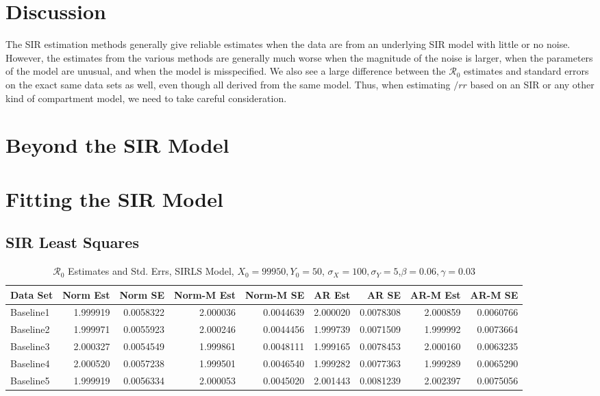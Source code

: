 \documentclass[12pt]{article}
\newcommand{\rr}{\ensuremath{\mathcal{R}_0}}
\begin{document}
\section{Discussion}\label{sec:discussion}

The SIR estimation methods generally give reliable estimates when the data are from an underlying SIR model with little or no noise. However, the estimates from the various methods are generally much worse when the magnitude of the noise is larger, when the parameters of the model are unusual, and when the model is misspecified. We also see a large difference between the $\rr$ estimates and standard errors on the exact same data sets as well, even though all derived from the same model. Thus, when estimating $/rr$ based on an SIR or any other kind of compartment model, we need to take careful consideration.





\appendix

\section{Beyond the SIR Model}

\section{Fitting the SIR Model}

\subsection{SIR Least Squares}

\begin{table}[H]
	
	\caption{\label{tab:}$\rr$ Estimates and Std. Errs, SIRLS Model,
		$X_0 = 99950, Y_0 = 50$, $\sigma_X = 100, \sigma_Y = 5$,$\beta = 0.06, \gamma = 0.03$}
	\centering
	\begin{footnotesize}
		\begin{tabular}[t]{l|r|r|r|r|r|r|r|r}
			\hline
			Data Set & Norm Est & Norm SE & Norm-M Est & Norm-M SE & AR Est & AR SE & AR-M Est & AR-M SE\\
			\hline
			Baseline1 & 1.999919 & 0.0058322 & 2.000036 & 0.0044639 & 2.000020 & 0.0078308 & 2.000859 & 0.0060766\\
			\hline
			Baseline2 & 1.999971 & 0.0055923 & 2.000246 & 0.0044456 & 1.999739 & 0.0071509 & 1.999992 & 0.0073664\\
			\hline
			Baseline3 & 2.000327 & 0.0054549 & 1.999861 & 0.0048111 & 1.999165 & 0.0078453 & 2.000160 & 0.0063235\\
			\hline
			Baseline4 & 2.000520 & 0.0057238 & 1.999501 & 0.0046540 & 1.999282 & 0.0077363 & 1.999289 & 0.0065290\\
			\hline
			Baseline5 & 1.999919 & 0.0056334 & 2.000053 & 0.0045020 & 2.001443 & 0.0081239 & 2.002397 & 0.0075056\\
			\hline
		\end{tabular}
	\end{footnotesize}
\end{table}
\end{document}
